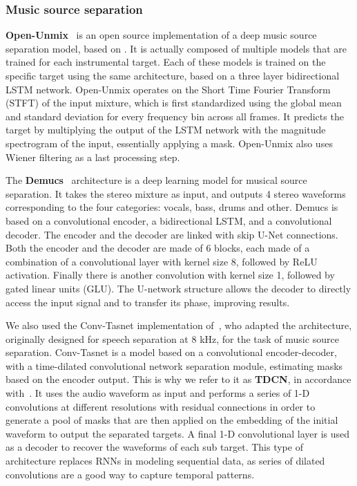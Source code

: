 \documentclass[letterpaper]{article}  %
\begin{document}
      \subsubsection{Music source separation}
      \textbf{Open-Unmix}~\cite{open-unmix} is an open source implementation of a deep music source separation model, based on \cite{Uhlich2017}. It is actually composed of multiple models that are trained for each instrumental target. Each of these models is trained on the specific target using the same architecture, based on a three layer bidirectional LSTM network. Open-Unmix operates on the Short Time Fourier Transform (STFT) of the input mixture, which is first standardized using the global mean and standard deviation for every frequency bin across all frames. It predicts the target by multiplying the output of the LSTM network with the magnitude spectrogram of the input, essentially applying a mask. Open-Unmix also uses Wiener filtering as a last processing step.

      The \textbf{Demucs}~\cite{demucs} architecture is a deep learning model for musical source separation. It takes the stereo mixture as input, and outputs 4 stereo waveforms corresponding to the four categories: vocals, bass, drums and other. Demucs is based on a convolutional encoder, a bidirectional LSTM, and a convolutional decoder. The encoder and the decoder are linked with skip U-Net connections. Both the encoder and the decoder are made of 6 blocks, each made of a combination of a convolutional layer with kernel size 8, followed by ReLU activation. Finally there is another convolution with kernel size 1, followed by gated linear units (GLU). The U-network structure allows the decoder to directly access the input signal and to transfer its phase, improving results.

      We also used the Conv-Tasnet\cite{tdcn} implementation of~\cite{demucs}, who adapted the architecture, originally designed for speech separation at 8 kHz, for the task of music source separation. Conv-Tasnet is a model based on a convolutional encoder-decoder, with a time-dilated convolutional network separation module, estimating masks based on the encoder output. This is why we refer to it as \textbf{TDCN}, in accordance with~\cite{tdcnpp}. It uses the audio waveform as input and performs a series of 1-D convolutions at different resolutions with residual connections in order to generate a pool of masks that are then applied on the embedding of the initial waveform to output the separated targets. A final 1-D convolutional layer is used as a decoder to recover the waveforms of each sub target. This type of architecture replaces RNNs in modeling sequential data, as series of dilated convolutions are a good way to capture temporal patterns.
\end{document}
